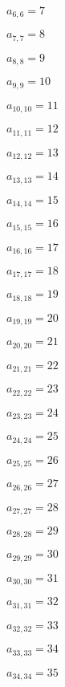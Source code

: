 \documentclass[a4paper,12pt]{article}
\begin{document}
$a _{ 6, 6 } = 7$

$a _{ 7, 7 } = 8$

$a _{ 8, 8 } = 9$

$a _{ 9, 9 } = 10$

$a _{ 10, 10 } = 11$

$a _{ 11, 11 } = 12$

$a _{ 12, 12 } = 13$

$a _{ 13, 13 } = 14$

$a _{ 14, 14 } = 15$

$a _{ 15, 15 } = 16$

$a _{ 16, 16 } = 17$

$a _{ 17, 17 } = 18$

$a _{ 18, 18 } = 19$

$a _{ 19, 19 } = 20$

$a _{ 20, 20 } = 21$

$a _{ 21, 21 } = 22$

$a _{ 22, 22 } = 23$

$a _{ 23, 23 } = 24$

$a _{ 24, 24 } = 25$

$a _{ 25, 25 } = 26$

$a _{ 26, 26 } = 27$

$a _{ 27, 27 } = 28$

$a _{ 28, 28 } = 29$

$a _{ 29, 29 } = 30$

$a _{ 30, 30 } = 31$

$a _{ 31, 31 } = 32$

$a _{ 32, 32 } = 33$

$a _{ 33, 33 } = 34$

$a _{ 34, 34 } = 35$
\end{document}
